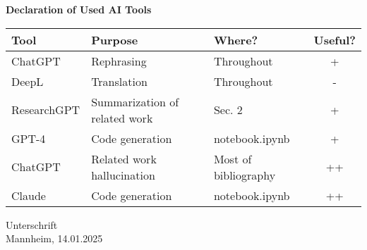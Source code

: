 \documentclass[runningheads]{llncs}
\begin{document}
\begin{center}
  \textbf{Declaration of Used AI Tools} \\[.3em]
  \begin{tabularx}{\textwidth}{lXlc}
    \toprule
    Tool & Purpose & Where? & Useful? \\
    \midrule
    ChatGPT & Rephrasing & Throughout & + \\
    DeepL & Translation & Throughout & - \\
    ResearchGPT & Summarization of related work & Sec. 2~ & + \\
    GPT-4 & Code generation & notebook.ipynb & + \\
    ChatGPT & Related work hallucination & Most of bibliography & ++ \\
    Claude & Code generation & notebook.ipynb & ++ \\
    \bottomrule
  \end{tabularx}
\end{center}

\vspace{2cm}
\noindent Unterschrift\\
\noindent Mannheim, 14.01.2025 \hfill
\end{document}
